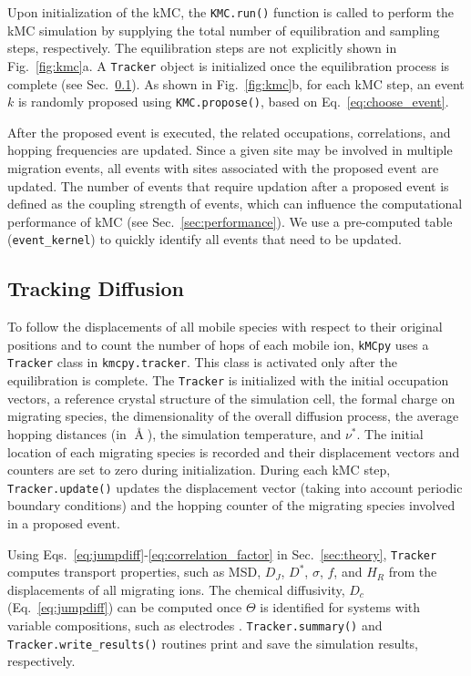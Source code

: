 \documentclass[a4paper,fleqn]{cas-dc}
\begin{document}
{Upon initialization of the kMC, the \texttt{KMC.run()} function is called to perform the kMC simulation by supplying the total number of equilibration and sampling steps, respectively. The equilibration steps are not explicitly shown in Fig.~{\ref{fig:kmc}}a. A \texttt{Tracker} object is initialized once the equilibration process is complete (see Sec.~\ref{sec:tracker}). As shown in Fig.~\ref{fig:kmc}b, for each kMC step, an event $k$ is randomly proposed using \texttt{KMC.propose()}, based on Eq.~{\ref{eq:choose_event}}. 

After the proposed event is executed, the related occupations, correlations, and hopping frequencies are updated. Since a given site may be involved in multiple migration events, all events with sites associated with the proposed event are updated. The number of events that require updation after a proposed event is defined as the coupling strength of events, which can influence the computational performance of kMC (see Sec.~\ref{sec:performance}). We use a pre-computed table (\texttt{event\_kernel}) to quickly identify all events that need to be updated. 
    
\subsection{Tracking Diffusion}\label{sec:tracker}
\noindent To follow the displacements of all mobile species with respect to their original positions and to count the number of hops of each mobile ion, \texttt{kMCpy} uses a \texttt{Tracker} class in \texttt{kmcpy.tracker}.  This class is activated only after the equilibration is complete. The \texttt{Tracker} is initialized with the initial occupation vectors, a reference crystal structure of the simulation cell, the formal charge on migrating species, the dimensionality of the overall diffusion process, the average hopping distances (in $\Angstrom$), the simulation temperature, and $\nu^*$. The initial location of each migrating species is recorded and their displacement vectors and counters are set to zero during initialization. During each kMC step, \texttt{Tracker.update()} updates the displacement vector (taking into account periodic boundary conditions) and the hopping counter of the migrating species involved in a proposed event. 

Using Eqs.~{\ref{eq:jumpdiff}}-{\ref{eq:correlation_factor}} in Sec.~{\ref{sec:theory}}, \texttt{Tracker} computes transport properties, such as MSD, $D_J$, $D^*$, $\sigma$, $f$, and $H_R$ from the displacements of all migrating ions. The chemical diffusivity, $D_c$ (Eq.~\ref{eq:jumpdiff}) can be computed once $\Theta$ is identified for systems with variable compositions, such as electrodes \cite{van_der_ven_rechargeable_2020}. \texttt{Tracker.summary()} and \texttt{Tracker.write\_results()} routines  print and save the simulation results, respectively.

}
\end{document}

